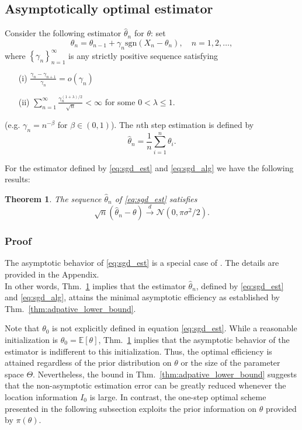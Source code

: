 \documentclass[letterpaper, conference]{IEEEtran}      %
\newtheorem{thm}{\bf{Theorem}}
\newcommand{\sgn}{\mathrm{sgn} }
\begin{document}
\subsection{Asymptotically optimal estimator}
Consider the following estimator $\widehat{\theta}_n$ for $\theta$:  set 
\begin{equation}
\label{eq:sgd_alg}
\theta_n = \theta_{n-1} +  \gamma_n \sgn (X_n - \theta_n), \quad n = 1,2,\ldots,
\end{equation}
where $\left\{\gamma_n \right\}_{n=1}^\infty$ is any strictly positive sequence satisfying 
\begin{enumerate}
\item[(i)] $\frac{\gamma_n - \gamma_{n+1}}{\gamma_n} = o(\gamma_n)$ \\
\item[(ii)] $\sum_{n=1}^\infty \frac{\gamma_n^{(1+\lambda)/2}} {\sqrt{n}} < \infty$ 
for some $0< \lambda \leq 1$.
\end{enumerate}
(e.g. $\gamma_n = n^{-\beta}$ for $\beta \in (0,1)$). The $n$th step estimation is defined by 
\begin{equation} \label{eq:sgd_est}
\widehat{\theta}_n =  \frac{1}{n} \sum_{i=1}^n  \theta_i. 
\end{equation}

For the estimator defined by \eqref{eq:sgd_est} and \eqref{eq:sgd_alg} 
we have the following results:
\begin{thm} \label{thm:sgd}
The sequence $\widehat{\theta}_n$ of \eqref{eq:sgd_est} satisfies
\[
\sqrt{n} \left( \widehat{\theta}_n - \theta \right) \overset{d}{\rightarrow} \mathcal N \left(0,  \pi \sigma^2 /2 \right).
\]
\end{thm}

\subsubsection*{Proof}
The asymptotic behavior of \eqref{eq:sgd_est} is a special case of  \cite[Thm. 4]{polyak1992acceleration}. The details are provided in the Appendix.\\

In other words, Thm.~\ref{thm:sgd} implies that the estimator $\widehat{\theta}_n$, defined by \eqref{eq:sgd_est} and \eqref{eq:sgd_alg}, attains the minimal asymptotic efficiency as established by Thm.~\ref{thm:adpative_lower_bound}.\par
Note that $\theta_0$ is not explicitly defined 
in equation \eqref{eq:sgd_est}. While a reasonable initialization is $\theta_0 = \mathbb E [\theta]$,  Thm.~\ref{thm:sgd} implies that the asymptotic behavior of the estimator is indifferent to this initialization. Thus, the optimal efficiency is attained regardless of the prior distribution on $\theta$ or the size of the parameter space $\Theta$. Nevertheless, the bound in Thm.~\ref{thm:adpative_lower_bound} suggests that the non-asymptotic estimation error can be greatly reduced whenever the location information $I_0$ is large. In contrast, the one-step optimal scheme presented in the following subsection exploits the prior information on $\theta$ provided by $\pi(\theta)$.
\end{document}
